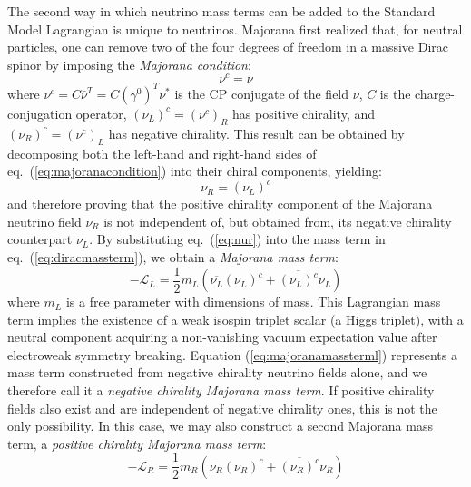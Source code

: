 The second way in which neutrino mass terms can be added to the Standard Model Lagrangian is unique to neutrinos. Majorana first realized \cite{Majorana:1937vz} that, for neutral particles, one can remove two of the four degrees of freedom in a massive Dirac spinor by imposing the \emph{Majorana condition}:
\begin{equation}
\nu^c = \nu
\label{eq:majoranacondition}
\end{equation}
where $\nu^c = C\bar{\nu}^T=C(\gamma^0)^T\nu^{\ast}$ is the CP conjugate of the field $\nu$, $C$ is the charge-conjugation operator, $(\nu_L)^c=(\nu^c)_R$ has positive chirality, and $(\nu_R)^c=(\nu^c)_L$ has negative chirality. This result can be obtained by decomposing both the left-hand and right-hand sides of eq.~(\ref{eq:majoranacondition}) into their chiral components, yielding:
\begin{equation}
\nu_R = (\nu_L)^c
\label{eq:nur}
\end{equation}
and therefore proving that the positive chirality component of the Majorana neutrino field $\nu_R$ is not independent of, but obtained from, its negative chirality counterpart $\nu_L$. By substituting eq.~(\ref{eq:nur}) into the mass term in eq.~(\ref{eq:diracmassterm}), we obtain a \emph{Majorana mass term}:
\begin{equation}
\label{eq:majoranamassterml}
-\mathcal{L}_L= \frac{1}{2}m_L(\overline{\nu_L}(\nu_L)^c+\overline{(\nu_L)^c}\nu_L)
\end{equation}
where $m_L$ is a free parameter with dimensions of mass. This Lagrangian mass term implies the existence of a weak isospin triplet scalar (a Higgs triplet), with a neutral component acquiring a non-vanishing vacuum expectation value after electroweak symmetry breaking. Equation (\ref{eq:majoranamassterml}) represents a mass term constructed from negative chirality neutrino fields alone, and we therefore call it a \emph{negative chirality Majorana mass term}. If positive chirality fields also exist and are independent of negative chirality ones, this is not the only possibility. In this case, we may also construct a second Majorana mass term, a \emph{positive chirality Majorana mass term}:
\begin{equation}
\label{eq:majoranamasstermr}
-\mathcal{L}_R= \frac{1}{2}m_R(\overline{\nu_R}(\nu_R)^c+\overline{(\nu_R)^c}\nu_R)
\end{equation}

